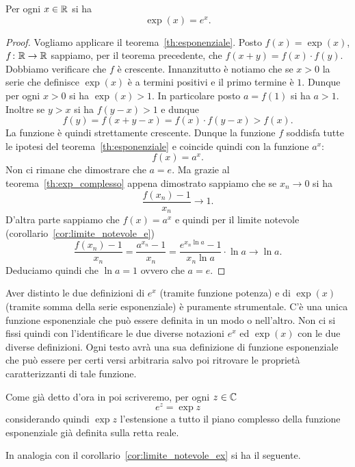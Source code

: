 \begin{theorem}%
\label{th:exp=ex}%
%
\mymark{***}%
Per ogni $x\in \mathbb R$ si ha
\[
  \exp(x) = e^x.
\]
\end{theorem}
%
\begin{proof}\mymark{**}
Vogliamo applicare il teorema~\ref{th:esponenziale}.
Posto $f(x)=\exp(x)$, $f\colon \mathbb R\to\mathbb R$ sappiamo,
per il teorema precedente, che $f(x+y)=f(x)\cdot f(y)$.
Dobbiamo verificare che $f$ è crescente.
Innanzitutto è notiamo che se $x> 0$ la serie che definisce
$\exp(x)$ è a termini positivi e il primo termine è $1$.
Dunque per ogni $x> 0$ si ha $\exp(x)>1$.
In particolare posto $a=f(1)$ si ha $a>1$.
Inoltre se $y>x$ si ha $f(y-x)>1$ e dunque
\[
 f(y) = f(x+y-x) = f(x)\cdot f(y-x) > f(x).
\]
La funzione è quindi strettamente crescente.
Dunque la funzione $f$ soddisfa tutte le ipotesi
del teorema~\ref{th:esponenziale} e coincide
quindi con la funzione $a^x$:
\[
  f(x)= a^x.
\]
Non ci rimane che dimostrare che $a=e$.
Ma grazie al teorema~\ref{th:exp_complesso}
appena dimostrato sappiamo che se $x_n\to 0$ si ha
\[
  \frac{f(x_n)-1}{x_n}\to 1.
\]
D'altra parte sappiamo che $f(x)=a^x$ e quindi
per il limite notevole (corollario~\ref{cor:limite_notevole_e})
\[
\frac{f(x_n)-1}{x_n} = \frac{a^{x_n}-1}{x_n}
= \frac{e^{x_n \ln a}-1}{x_n \ln a} \cdot \ln a
\to \ln a.
\]
Deduciamo quindi che $\ln a= 1$ ovvero che $a=e$.
\end{proof}

Aver distinto le due definizioni di $e^x$ (tramite funzione potenza) e di $\exp(x)$ (tramite somma della serie esponenziale) è puramente strumentale.
C'è una unica funzione esponenziale che può essere definita in
un modo o nell'altro. Non ci si fissi quindi con l'identificare
le due diverse notazioni $e^x$ ed $\exp(x)$ con le due diverse definizioni.
Ogni testo avrà una sua definizione di funzione esponenziale che può
essere per certi versi arbitraria salvo poi ritrovare le proprietà
caratterizzanti di tale funzione.

Come già detto d'ora in poi scriveremo, per ogni $z\in \mathbb C$
\[
  e^z = \exp z
\]
considerando quindi $\exp z$ l'estensione a tutto il piano complesso
della funzione esponenziale già definita
sulla retta reale.

In analogia con il corollario~\ref{cor:limite_notevole_ex}
si ha il seguente.

